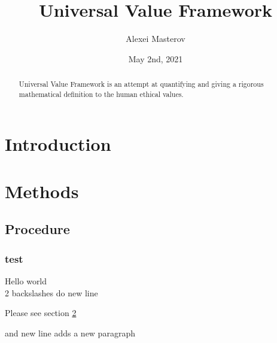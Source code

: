 \documentclass{article} %
\author{Alexei Masterov}
\title{Universal Value Framework}
\date{May 2nd, 2021}
\begin{document}
\maketitle %

\newpage
\begin{abstract}
Universal Value Framework is an attempt at quantifying and giving a rigorous mathematical definition to the human ethical values.
\end{abstract}

\newpage
\section{Introduction}

\section{Methods}\label{sec:methods}
\subsection{Procedure}
\subsubsection{test}

Hello world\\
2 backslashes do new line

Please see section \ref{sec:methods} %

and new line adds a new paragraph
\end{document}
